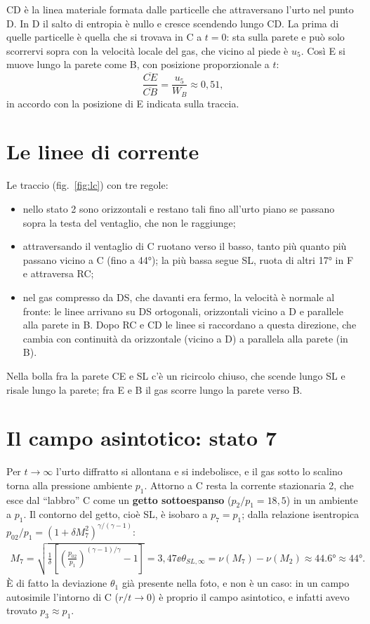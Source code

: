 CD è la linea materiale formata dalle particelle che attraversano l'urto nel punto D. In D il salto di entropia è nullo
e cresce scendendo lungo CD. La prima di quelle particelle è quella che si trovava in C a $t=0$: sta sulla parete e può
solo scorrervi sopra con la velocità locale del gas, che vicino al piede è $u_5$. Così E si muove lungo la parete come
B, con posizione proporzionale a $t$:
\[
\frac{\overline{CE}}{\overline{CB}}=\frac{u_5}{W_B}\approx0{,}51,
\]
in accordo con la posizione di E indicata sulla traccia.

\section*{Le linee di corrente}
Le traccio (fig.~\ref{fig:lc}) con tre regole:
\begin{itemize}
\item nello stato 2 sono orizzontali e restano tali fino all'urto piano se passano sopra la testa del ventaglio, che
  non le raggiunge;
\item attraversando il ventaglio di C ruotano verso il basso, tanto più quanto più passano vicino a C (fino a
  \ang{44}); la più bassa segue SL, ruota di altri \ang{17} in F e attraversa RC;
\item nel gas compresso da DS, che davanti era fermo, la velocità è normale al fronte: le linee arrivano su DS
  ortogonali, orizzontali vicino a D e parallele alla parete in B. Dopo RC e CD le linee si raccordano a questa
  direzione, che cambia con continuità da orizzontale (vicino a D) a parallela alla parete (in B).
\end{itemize}
Nella bolla fra la parete CE e SL c'è un ricircolo chiuso, che scende lungo SL e risale lungo la parete; fra E e B il
gas scorre lungo la parete verso B.

\section*{Il campo asintotico: stato 7}
Per $t\to\infty$ l'urto diffratto si allontana e si indebolisce, e il gas sotto lo scalino torna alla pressione
ambiente $p_1$. Attorno a C resta la corrente stazionaria 2, che esce dal ``labbro'' C come un \textbf{getto
sottoespanso} ($p_2/p_1=18{,}5$) in un ambiente a $p_1$. Il contorno del getto, cioè SL, è isobaro a $p_7=p_1$; dalla
relazione isentropica $p_{02}/p_1=(1+\delta M_7^2)^{\gamma/(\gamma-1)}$:
\begin{gather*}
M_7=\sqrt{\frac1\delta\left[\left(\frac{p_{02}}{p_1}\right)^{(\gamma-1)/\gamma}-1\right]}=3{,}47 \ee
\theta_{SL,\infty}=\nu(M_7)-\nu(M_2)\approx\ang{44.6}\approx\ang{44}.
\end{gather*}
È di fatto la deviazione $\theta_1$ già presente nella foto, e non è un caso: in un campo autosimile l'intorno di C
($r/t\to0$) è proprio il campo asintotico, e infatti avevo trovato $p_3\approx p_1$.

